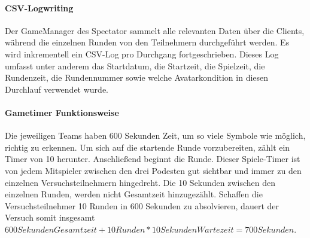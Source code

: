 \documentclass[a4paper,11pt]{article}%
\renewcommand{\\}{\vspace*{0.5\baselineskip} \newline}
\begin{document}
\paragraph{CSV-Logwriting}
Der GameManager des Spectator sammelt alle relevanten Daten über die Clients, während die einzelnen Runden von den Teilnehmern durchgeführt werden. Es wird inkrementell ein CSV-Log pro Durchgang fortgeschrieben. Dieses Log umfasst unter anderem das Startdatum, die Startzeit, die Spielzeit, die Rundenzeit, die Rundennummer %
sowie welche Avatarkondition in diesen Durchlauf verwendet wurde.

%
%

\paragraph{Gametimer Funktionsweise}
Die jeweiligen Teams haben 600 Sekunden Zeit, um so viele Symbole wie möglich, richtig zu erkennen. Um sich auf die startende Runde vorzubereiten, zählt ein Timer von 10 herunter. Anschließend beginnt die Runde. Dieser Spiele-Timer ist von jedem Mitspieler zwischen den drei Podesten gut sichtbar und immer zu den einzelnen Versuchsteilnehmern hingedreht. Die 10 Sekunden zwischen den einzelnen Runden, werden nicht Gesamtzeit hinzugezählt. Schaffen die Versuchsteilnehmer 10 Runden in 600 Sekunden zu absolvieren, dauert der Versuch somit insgesamt \\
$600 Sekunden Gesamtzeit + 10 Runden * 10 Sekunden Wartezeit = 700 Sekunden$.
\end{document}
